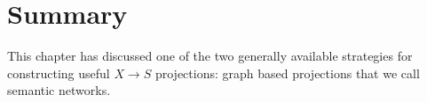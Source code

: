 %
%
%
\section{Summary}

This chapter has discussed one of the two generally available strategies for constructing useful $X \rightarrow S$ projections: graph based projections that we call semantic networks.

